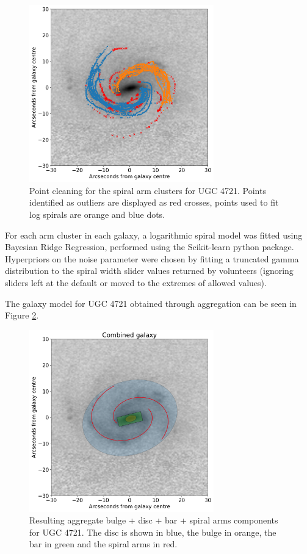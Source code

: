 \documentclass[../main.tex]{subfiles}
\begin{document}
\begin{figure}
  \includegraphics[width=8cm]{images__method/LOF_cleaning.pdf}
  \caption{Point cleaning for the spiral arm clusters for UGC 4721. Points identified as outliers are displayed as red crosses, points used to fit log spirals are orange and blue dots.}
  \label{fig:LOF_cleaning}
\end{figure}

For each arm cluster in each galaxy, a logarithmic spiral model was fitted using Bayesian Ridge Regression, performed using the Scikit-learn python package. Hyperpriors on the noise parameter were chosen by fitting a truncated gamma distribution to the spiral width slider values returned by volunteers (ignoring sliders left at the default or moved to the extremes of allowed values).

The galaxy model for UGC 4721 obtained through aggregation can be seen in Figure \ref{fig:aggregate_model}.

\begin{figure}
  \includegraphics[width=8cm]{images__method/aggregate_model.pdf}
  \caption{Resulting aggregate bulge + disc + bar + spiral arms components for UGC 4721. The disc is shown in blue, the bulge in orange, the bar in green and the spiral arms in red.}
  \label{fig:aggregate_model}
\end{figure}
\end{document}
